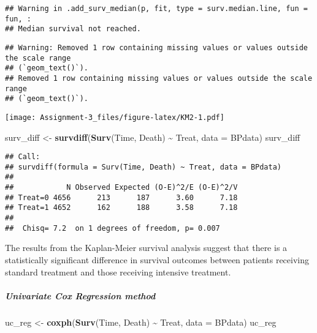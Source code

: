 \documentclass[
]{article}
\newenvironment{Shaded}{\begin{snugshade}}{\end{snugshade}}
\newcommand{\AttributeTok}[1]{\textcolor[rgb]{0.13,0.29,0.53}{#1}}
\newcommand{\FunctionTok}[1]{\textcolor[rgb]{0.13,0.29,0.53}{\textbf{#1}}}
\newcommand{\NormalTok}[1]{#1}
\newcommand{\OtherTok}[1]{\textcolor[rgb]{0.56,0.35,0.01}{#1}}
\newcommand{\SpecialCharTok}[1]{\textcolor[rgb]{0.81,0.36,0.00}{\textbf{#1}}}
\begin{document}
\begin{verbatim}
## Warning in .add_surv_median(p, fit, type = surv.median.line, fun = fun, :
## Median survival not reached.
\end{verbatim}

\begin{verbatim}
## Warning: Removed 1 row containing missing values or values outside the scale range
## (`geom_text()`).
## Removed 1 row containing missing values or values outside the scale range
## (`geom_text()`).
\end{verbatim}

\texttt{[image: Assignment-3\_files/figure-latex/KM2-1.pdf]}

\begin{Shaded}
\begin{Highlighting}[]
\NormalTok{surv\_diff }\OtherTok{\textless{}{-}} \FunctionTok{survdiff}\NormalTok{(}\FunctionTok{Surv}\NormalTok{(Time, Death) }\SpecialCharTok{\textasciitilde{}}\NormalTok{ Treat, }\AttributeTok{data =}\NormalTok{ BPdata)}
\NormalTok{surv\_diff}
\end{Highlighting}
\end{Shaded}

\begin{verbatim}
## Call:
## survdiff(formula = Surv(Time, Death) ~ Treat, data = BPdata)
## 
##            N Observed Expected (O-E)^2/E (O-E)^2/V
## Treat=0 4656      213      187      3.60      7.18
## Treat=1 4652      162      188      3.58      7.18
## 
##  Chisq= 7.2  on 1 degrees of freedom, p= 0.007
\end{verbatim}

The results from the Kaplan-Meier survival analysis suggest that there
is a statistically significant difference in survival outcomes between
patients receiving standard treatment and those receiving intensive
treatment.

\newpage

\subparagraph{Univariate Cox Regression
method}\label{univariate-cox-regression-method}

\begin{Shaded}
\begin{Highlighting}[]
\NormalTok{uc\_reg }\OtherTok{\textless{}{-}} \FunctionTok{coxph}\NormalTok{(}\FunctionTok{Surv}\NormalTok{(Time, Death) }\SpecialCharTok{\textasciitilde{}}\NormalTok{ Treat, }\AttributeTok{data =}\NormalTok{ BPdata)}
\NormalTok{uc\_reg}
\end{Highlighting}
\end{Shaded}
\end{document}
